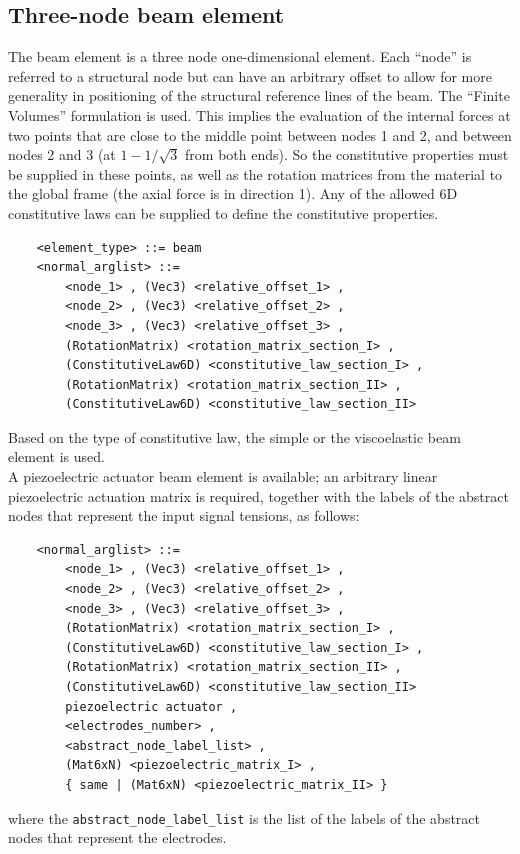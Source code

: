 \subsection{Three-node beam element}
The beam element is a three node one-dimensional element.
Each ``node'' is referred to a structural node but can have an arbitrary
offset to allow for more generality in positioning of the structural 
reference lines of the beam.
The ``Finite Volumes'' formulation is used. 
This implies the evaluation of the internal forces at two points 
that are close to the middle point between nodes 1 and 2, 
and between nodes 2 and 3 (at $ 1-1/\sqrt{3} $ from both ends).
So the constitutive properties must be supplied in these points, as well as
the rotation matrices from the material to the global frame (the axial force
is in direction 1).
Any of the allowed 6D constitutive laws can be supplied to define the
constitutive properties.
\begin{verbatim}
    <element_type> ::= beam
    <normal_arglist> ::=
        <node_1> , (Vec3) <relative_offset_1> ,
        <node_2> , (Vec3) <relative_offset_2> ,
        <node_3> , (Vec3) <relative_offset_3> ,
        (RotationMatrix) <rotation_matrix_section_I> ,
        (ConstitutiveLaw6D) <constitutive_law_section_I> ,
        (RotationMatrix) <rotation_matrix_section_II> ,
        (ConstitutiveLaw6D) <constitutive_law_section_II>
\end{verbatim}
Based on the type of constitutive law, the simple or the viscoelastic beam
element is used. \\
A piezoelectric actuator beam element is available; an arbitrary
linear piezoelectric actuation matrix is required, together with the labels
of the abstract nodes that represent the input signal tensions, as follows:
\begin{verbatim}
    <normal_arglist> ::=
        <node_1> , (Vec3) <relative_offset_1> ,
        <node_2> , (Vec3) <relative_offset_2> ,
        <node_3> , (Vec3) <relative_offset_3> ,
        (RotationMatrix) <rotation_matrix_section_I> ,
        (ConstitutiveLaw6D) <constitutive_law_section_I> ,
        (RotationMatrix) <rotation_matrix_section_II> ,
        (ConstitutiveLaw6D) <constitutive_law_section_II>
        piezoelectric actuator , 
        <electrodes_number> ,
        <abstract_node_label_list> ,
        (Mat6xN) <piezoelectric_matrix_I> ,
        { same | (Mat6xN) <piezoelectric_matrix_II> }
\end{verbatim}
where the \texttt{abstract\_node\_label\_list} is the list of the labels of the
abstract nodes that represent the electrodes.

